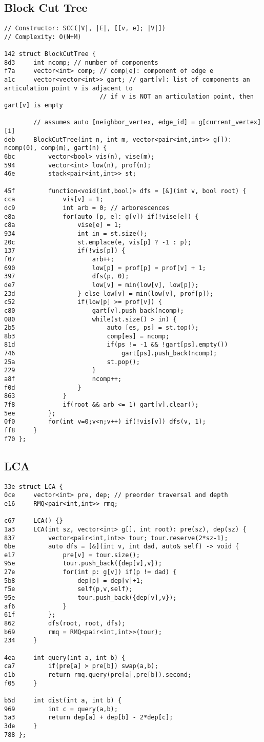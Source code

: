 \documentclass[11pt, a4paper, twoside]{article}
\begin{document}
\subsection{Block Cut Tree}
\begin{lstlisting}
// Constructor: SCC(|V|, |E|, [[v, e]; |V|])
// Complexity: O(N+M)

142 struct BlockCutTree {
8d3 	int ncomp; // number of components
f7a 	vector<int> comp; // comp[e]: component of edge e
a1c 	vector<vector<int>> gart; // gart[v]: list of components an articulation point v is adjacent to
    			          // if v is NOT an articulation point, then gart[v] is empty
    				
    	// assumes auto [neighbor_vertex, edge_id] = g[current_vertex][i]
deb 	BlockCutTree(int n, int m, vector<pair<int,int>> g[]): ncomp(0), comp(m), gart(n) {
6bc 		vector<bool> vis(n), vise(m);
594 		vector<int> low(n), prof(n);
46e 		stack<pair<int,int>> st;
    
45f 		function<void(int,bool)> dfs = [&](int v, bool root) {
cca 			vis[v] = 1;
dc9 			int arb = 0; // arborescences
e8a 			for(auto [p, e]: g[v]) if(!vise[e]) {
c8a 				vise[e] = 1;
934 				int in = st.size();
20c 				st.emplace(e, vis[p] ? -1 : p);
137 				if(!vis[p]) {
f07 					arb++;
690 					low[p] = prof[p] = prof[v] + 1;
397 					dfs(p, 0);
de7 					low[v] = min(low[v], low[p]);
23d 				} else low[v] = min(low[v], prof[p]);
c52 				if(low[p] >= prof[v]) {
c80 					gart[v].push_back(ncomp);
080 					while(st.size() > in) {
2b5 						auto [es, ps] = st.top();
8b3 						comp[es] = ncomp;
81d 						if(ps != -1 && !gart[ps].empty())
746 							gart[ps].push_back(ncomp);
25a 						st.pop();
229 					}
a8f 					ncomp++;
f0d 				}
863 			}
7f8 			if(root && arb <= 1) gart[v].clear();
5ee 		};
0f0 		for(int v=0;v<n;v++) if(!vis[v]) dfs(v, 1);
ff8 	}
f70 };
\end{lstlisting}

\subsection{LCA}
\begin{lstlisting}
33e struct LCA {
0ce 	vector<int> pre, dep; // preorder traversal and depth
e16 	RMQ<pair<int,int>> rmq;
    
c67 	LCA() {}
1a3 	LCA(int sz, vector<int> g[], int root): pre(sz), dep(sz) {
837 		vector<pair<int,int>> tour; tour.reserve(2*sz-1);
6be 		auto dfs = [&](int v, int dad, auto& self) -> void {
e17 			pre[v] = tour.size();
95e 			tour.push_back({dep[v],v});
27e 			for(int p: g[v]) if(p != dad) {
5b8 				dep[p] = dep[v]+1;
f5e 				self(p,v,self);
95e 				tour.push_back({dep[v],v});
af6 			}
61f 		};
862 		dfs(root, root, dfs);
b69 		rmq = RMQ<pair<int,int>>(tour);
234 	}
    
4ea 	int query(int a, int b) {
ca7 		if(pre[a] > pre[b]) swap(a,b);
d1b 		return rmq.query(pre[a],pre[b]).second;
f05 	}
    
b5d 	int dist(int a, int b) {
969 		int c = query(a,b);
5a3 		return dep[a] + dep[b] - 2*dep[c];
3de 	}
788 };
\end{lstlisting}
\end{document}
